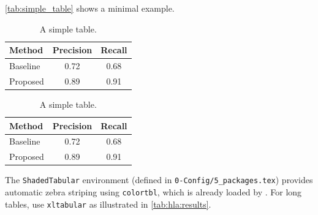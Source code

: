 \autoref{tab:simple_table} shows a minimal example.

\begin{latexcode}
\begin{table}[htbp]
  \caption{A simple table.}
  \label{tab:simple_table}
  \centering
  \begin{tabular}{lcc}
    \toprule
    Method   & Precision & Recall \\
    \midrule
    Baseline & 0.72      & 0.68   \\
    Proposed & 0.89      & 0.91   \\
    \bottomrule
  \end{tabular}
\end{table}
\end{latexcode}

\begin{table}[htbp]
  \caption{A simple table.}
  \label{tab:simple_table}
  \centering
  \begin{tabular}{lcc}
    \toprule
    Method   & Precision & Recall \\
    \midrule
    Baseline & 0.72      & 0.68   \\
    Proposed & 0.89      & 0.91   \\
    \bottomrule
  \end{tabular}
\end{table}

The \texttt{ShadedTabular} environment (defined in \texttt{0-Config/5\_packages.tex}) provides automatic zebra striping using \texttt{colortbl}, which is already loaded by \novathesis.
For long tables, use \texttt{xltabular} as illustrated in \autoref{tab:hla:results}.

